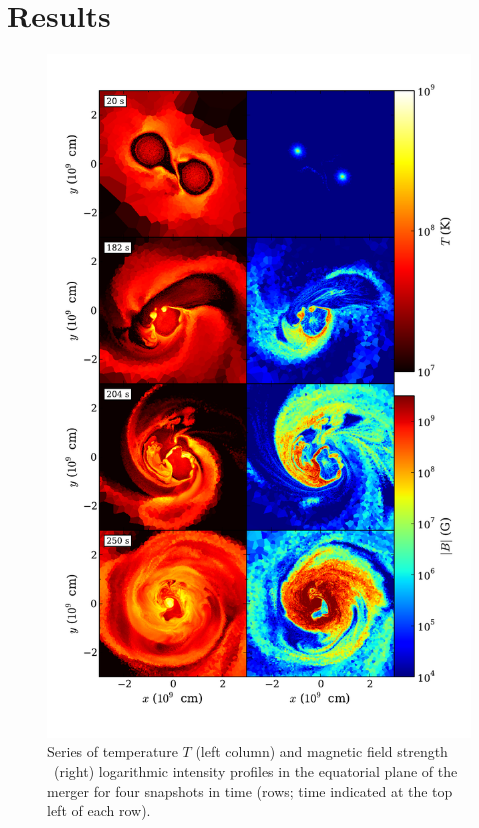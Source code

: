 \section{Results}
\label{sec:c4_results}

\begin{figure}
\centering
\includegraphics[angle=0,width=0.8\columnwidth]{chapter4_zhu+15/figures/snapshots.pdf}
\caption{Series of temperature $T$ (left column) and magnetic field strength \Bmag\ (right) logarithmic intensity profiles in the equatorial plane of the merger for four snapshots in time (rows; time indicated at the top left of each row).}
\label{fig:c4_snapshots}
\end{figure}

